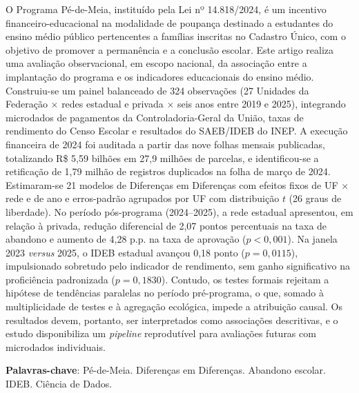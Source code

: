 
\begin{resumo}

    O Programa Pé-de-Meia, instituído pela Lei nº 14.818/2024, é um incentivo financeiro-educacional na modalidade de poupança destinado a estudantes do ensino médio público pertencentes a famílias inscritas no Cadastro Único, com o objetivo de promover a permanência e a conclusão escolar.
    Este artigo realiza uma avaliação observacional, em escopo nacional, da associação entre a implantação do programa e os indicadores educacionais do ensino médio.
    Construiu-se um painel balanceado de 324 observações (27 Unidades da Federação $\times$ redes estadual e privada $\times$ seis anos entre 2019 e 2025), integrando microdados de pagamentos da Controladoria-Geral da União, taxas de rendimento do Censo Escolar e resultados do SAEB/IDEB do INEP.
    A execução financeira de 2024 foi auditada a partir das nove folhas mensais publicadas, totalizando R\$ 5,59 bilhões em 27,9 milhões de parcelas, e identificou-se a retificação de 1,79 milhão de registros duplicados na folha de março de 2024.
    Estimaram-se 21 modelos de Diferenças em Diferenças com efeitos fixos de UF $\times$ rede e de ano e erros-padrão agrupados por UF com distribuição $t$ (26 graus de liberdade).
    No período pós-programa (2024--2025), a rede estadual apresentou, em relação à privada, redução diferencial de 2,07 pontos percentuais na taxa de abandono e aumento de 4,28 p.p. na taxa de aprovação ($p < 0{,}001$).
    Na janela 2023 \textit{versus} 2025, o IDEB estadual avançou 0,18 ponto ($p = 0{,}0115$), impulsionado sobretudo pelo indicador de rendimento, sem ganho significativo na proficiência padronizada ($p = 0{,}1830$).
    Contudo, os testes formais rejeitam a hipótese de tendências paralelas no período pré-programa, o que, somado à multiplicidade de testes e à agregação ecológica, impede a atribuição causal.
    Os resultados devem, portanto, ser interpretados como associações descritivas, e o estudo disponibiliza um \textit{pipeline} reprodutível para avaliações futuras com microdados individuais.

    \par\vspace{\baselineskip}

    \noindent\textbf{Palavras-chave}: Pé-de-Meia. Diferenças em Diferenças. Abandono escolar. IDEB. Ciência de Dados.
\end{resumo}
